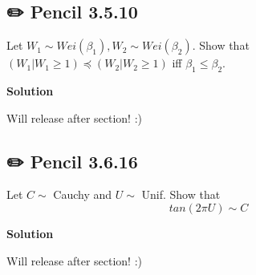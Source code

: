 \documentclass[
  letterpaper,
  DIV=11,
  numbers=noendperiod]{scrreprt}
\theoremstyle{definition}
\theoremstyle{plain}
\theoremstyle{remark}
\begin{document}
\hypertarget{pencil-3.5.10}{%
\subsection*{✏️ Pencil 3.5.10}\label{pencil-3.5.10}}

Let \(W_1 \sim Wei(\beta_1), W_2 \sim Wei(\beta_2)\). Show that
\((W_1|W_1 \geq 1) \preceq (W_2|W_2 \geq 1)\) iff
\(\beta_1 \leq \beta_2\).

\begin{tcolorbox}[enhanced jigsaw, leftrule=.75mm, colframe=quarto-callout-tip-color-frame, colback=white, breakable, opacityback=0, left=2mm, bottomrule=.15mm, arc=.35mm, rightrule=.15mm, toprule=.15mm]
\begin{minipage}[t]{5.5mm}
\textcolor{quarto-callout-tip-color}{\faLightbulb}
\end{minipage}%
\begin{minipage}[t]{\textwidth - 5.5mm}

\textbf{Solution}\vspace{2mm}

Will release after section! :)

\end{minipage}%
\end{tcolorbox}

\hypertarget{pencil-3.6.16}{%
\subsection*{✏️ Pencil 3.6.16}\label{pencil-3.6.16}}

Let \(C \sim\) Cauchy and \(U \sim\) Unif. Show that
\[tan(2 \pi U) \sim C\]

\begin{tcolorbox}[enhanced jigsaw, leftrule=.75mm, colframe=quarto-callout-tip-color-frame, colback=white, breakable, opacityback=0, left=2mm, bottomrule=.15mm, arc=.35mm, rightrule=.15mm, toprule=.15mm]
\begin{minipage}[t]{5.5mm}
\textcolor{quarto-callout-tip-color}{\faLightbulb}
\end{minipage}%
\begin{minipage}[t]{\textwidth - 5.5mm}

\textbf{Solution}\vspace{2mm}

Will release after section! :)

\end{minipage}%
\end{tcolorbox}
\end{document}
